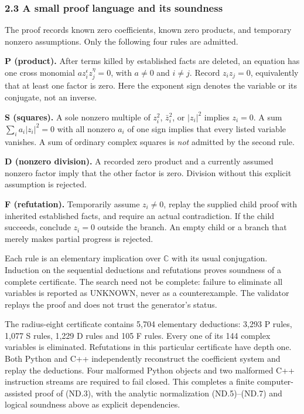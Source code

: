 \subsubsection{2.3 A small proof language and its soundness}\label{nondegeneracy:a-small-proof-language-and-its-soundness}

The proof records known zero coefficients, known zero products, and temporary nonzero assumptions. Only the following four rules are admitted.

\textbf{P (product).} After terms killed by established facts are deleted, an equation has one cross monomial \(a z_i^{\epsilon}z_j^{\eta}=0\), with \(a\ne0\) and \(i\ne j\). Record \(z_i z_j=0\), equivalently that at least one factor is zero. Here the exponent sign denotes the variable or its conjugate, not an inverse.

\textbf{S (squares).} A sole nonzero multiple of \(z_i^2\), \(\bar z_i^2\), or \(|z_i|^2\) implies \(z_i=0\). A sum \(\sum_i a_i|z_i|^2=0\) with all nonzero \(a_i\) of one sign implies that every listed variable vanishes. A sum of ordinary complex squares is \emph{not} admitted by the second rule.

\textbf{D (nonzero division).} A recorded zero product and a currently assumed nonzero factor imply that the other factor is zero. Division without this explicit assumption is rejected.

\textbf{F (refutation).} Temporarily assume \(z_i\ne0\), replay the supplied child proof with inherited established facts, and require an actual contradiction. If the child succeeds, conclude \(z_i=0\) outside the branch. An empty child or a branch that merely makes partial progress is rejected.

Each rule is an elementary implication over \(\mathbb C\) with its usual conjugation. Induction on the sequential deductions and refutations proves soundness of a complete certificate. The search need not be complete: failure to eliminate all variables is reported as UNKNOWN, never as a counterexample. The validator replays the proof and does not trust the generator's status.

The radius-eight certificate contains 5,704 elementary deductions: 3,293 P rules, 1,077 S rules, 1,229 D rules and 105 F rules. Every one of its 144 complex variables is eliminated. Refutations in this particular certificate have depth one. Both Python and C++ independently reconstruct the coefficient system and replay the deductions. Four malformed Python objects and two malformed C++ instruction streams are required to fail closed. This completes a finite computer-assisted proof of (ND.3), with the analytic normalization (ND.5)--(ND.7) and logical soundness above as explicit dependencies.

